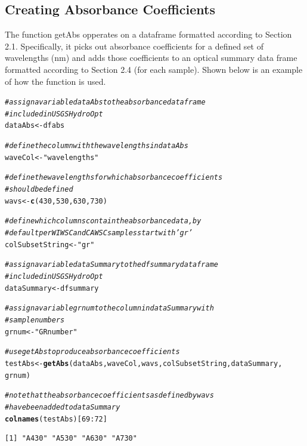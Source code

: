 \documentclass[a4paper,11pt]{article}\usepackage[]{graphicx}\usepackage[]{color}
\makeatletter
\newcommand{\hlnum}[1]{\textcolor[rgb]{0.686,0.059,0.569}{#1}}%
\newcommand{\hlstr}[1]{\textcolor[rgb]{0.192,0.494,0.8}{#1}}%
\newcommand{\hlcom}[1]{\textcolor[rgb]{0.678,0.584,0.686}{\textit{#1}}}%
\newcommand{\hlopt}[1]{\textcolor[rgb]{0,0,0}{#1}}%
\newcommand{\hlstd}[1]{\textcolor[rgb]{0.345,0.345,0.345}{#1}}%
\newcommand{\hlkwb}[1]{\textcolor[rgb]{0.69,0.353,0.396}{#1}}%
\newcommand{\hlkwd}[1]{\textcolor[rgb]{0.737,0.353,0.396}{\textbf{#1}}}%
\newenvironment{kframe}{%
 \def\at@end@of@kframe{}%
 \ifinner\ifhmode%
  \def\at@end@of@kframe{\end{minipage}}%
  \begin{minipage}{\columnwidth}%
 \fi\fi%
 \def\FrameCommand##1{\hskip\@totalleftmargin \hskip-\fboxsep
 \colorbox{shadecolor}{##1}\hskip-\fboxsep
     \hskip-\linewidth \hskip-\@totalleftmargin \hskip\columnwidth}%
 \MakeFramed {\advance\hsize-\width
   \@totalleftmargin\z@ \linewidth\hsize
   \@setminipage}}%
 {\par\unskip\endMakeFramed%
 \at@end@of@kframe}
\newenvironment{knitrout}{}{} %
\makeatother
\begin{document}
\subsection{Creating Absorbance Coefficients}
The function getAbs opperates on a dataframe formatted according to Section 2.1. Specifically, it picks out absorbance coefficients for a defined set of wavelengths (nm) and adds those coefficients to an optical summary data frame formatted according to Section 2.4 (for each sample). Shown below is an example of how the function is used.

\begin{knitrout}
\color{fgcolor}\begin{kframe}
\begin{alltt}
\hlcom{# assign a variable dataAbs to the absorbance dataframe}
\hlcom{# included in USGSHydroOpt}
\hlstd{dataAbs} \hlkwb{<-} \hlstd{dfabs}

\hlcom{# define the column with the wavelengths in dataAbs}
\hlstd{waveCol} \hlkwb{<-} \hlstr{"wavelengths"}

\hlcom{# define the wavelengths for which absorbance coefficients}
\hlcom{# should be defined}
\hlstd{wavs} \hlkwb{<-} \hlkwd{c}\hlstd{(}\hlnum{430}\hlstd{,} \hlnum{530}\hlstd{,} \hlnum{630}\hlstd{,} \hlnum{730}\hlstd{)}

\hlcom{# define which columns contain the absorbance data, by}
\hlcom{# default per WI WSC and CA WSC samples start with 'gr'}
\hlstd{colSubsetString} \hlkwb{<-} \hlstr{"gr"}

\hlcom{# assign a variable dataSummary to the dfsummary dataframe}
\hlcom{# included in USGSHydroOpt}
\hlstd{dataSummary} \hlkwb{<-} \hlstd{dfsummary}

\hlcom{# assign a variable grnum to the column in dataSummary with}
\hlcom{# sample numbers}
\hlstd{grnum} \hlkwb{<-} \hlstr{"GRnumber"}

\hlcom{# use getAbs to produce absorbance coefficients}
\hlstd{testAbs} \hlkwb{<-} \hlkwd{getAbs}\hlstd{(dataAbs, waveCol, wavs, colSubsetString, dataSummary,}
    \hlstd{grnum)}

\hlcom{# note that the absorbance coefficients as defined by wavs}
\hlcom{# have been added to dataSummary}
\hlkwd{colnames}\hlstd{(testAbs)[}\hlnum{69}\hlopt{:}\hlnum{72}\hlstd{]}
\end{alltt}
\begin{verbatim}
[1] "A430" "A530" "A630" "A730"
\end{verbatim}
\end{kframe}
\end{knitrout}
\end{document}

